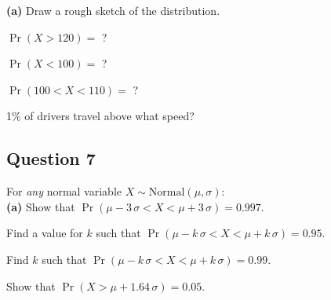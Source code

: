 {\bf(a)} Draw a rough sketch of the distribution. 
 \item  $\Pr(X>120)=$ ? 
 \item  $\Pr(X<100)=$ ? 
 \item  $\Pr(100<X<110)=$ ? 
 \item  1\% of drivers travel above what speed?







\subsection*{Question 7}
For \emph{any} normal variable $X \sim \text{Normal}(\mu,\sigma)$:\\[-0.2cm]

{\bf(a)} Show that $\Pr(\mu-3\,\sigma<X<\mu+3\,\sigma) = 0.997$. 
 \item  Find a value for $k$ such that $\Pr(\mu-k\,\sigma<X<\mu+k\,\sigma) = 0.95$. 
 \item  Find $k$ such that $\Pr(\mu-k\,\sigma<X<\mu+k\,\sigma) = 0.99$. 
 \item  Show that $\Pr(X>\mu+1.64\,\sigma) = 0.05.$

